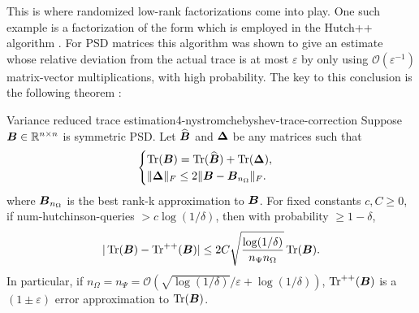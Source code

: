 This is where randomized low-rank factorizations come into play.
One such example is a factorization of the form 
which is employed in the Hutch++ algorithm \cite[algorithm~1]{meyer2021hutch}.
For \gls{PSD} matrices this algorithm was shown to give
an estimate whose relative deviation from the actual trace is at most
$\varepsilon$ by only using $\mathcal{O}(\varepsilon^{-1})$ matrix-vector multiplications,
with high probability. The key to this conclusion is the following theorem \cite[theorem~1]{meyer2021hutch}:
\begin{theorem}{Variance reduced trace estimation}{4-nystromchebyshev-trace-correction}
    Suppose $\boldsymbol{B} \in \mathbb{R}^{n \times n}$ is symmetric \gls{PSD}. Let $\widehat{\boldsymbol{B}}$ and
    $\boldsymbol{\Delta}$ be any matrices such that
    \begin{equation}
        \begin{cases}
            \operatorname{Tr}(\boldsymbol{B}) = \operatorname{Tr}(\widehat{\boldsymbol{B}}) + \operatorname{Tr}(\boldsymbol{\Delta}), \\
            \lVert \boldsymbol{\Delta} \rVert _F \leq 2 \lVert \boldsymbol{B} - \boldsymbol{B}_{n_{\Omega}} \rVert _F.
        \end{cases}
    \end{equation}
    where $\boldsymbol{B}_{n_{\Omega}}$ is the best rank-k approximation to $\boldsymbol{B}$.
    For fixed constants $c, C \geq 0$, if \gls{num-hutchinson-queries} $> c\log(1/\delta)$, then with probability $\geq 1 - \delta$,
    \begin{equation}
        |\operatorname{Tr}(\boldsymbol{B}) - \operatorname{Tr}^{++}(\boldsymbol{B})| \leq 2 C \sqrt{\frac{\log(1/\delta)}{n_{\Psi} n_{\Omega}}} \operatorname{Tr}(\boldsymbol{B}).
    \end{equation}
    In particular, if $n_{\Omega}=n_{\Psi}=\mathcal{O}\left( \sqrt{\log(1/\delta)}/ \varepsilon + \log(1/\delta) \right)$, $\operatorname{Tr}^{++}(\boldsymbol{B})$ is a $(1 \pm \varepsilon)$ error approximation to $\operatorname{Tr}(\boldsymbol{B})$.
\end{theorem}

